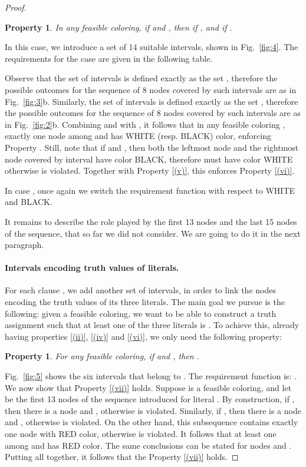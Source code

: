 \documentclass[a4paper,11pt]{article}
\theoremstyle{theorem}
\newtheorem{property}[theorem]{Property}
\begin{document}
\begin{proof}
\begin{property}\label{(vi)}
In any feasible coloring, if  and , then  if , and  if . 
\end{property}

\noindent In this case, we introduce a set  of 14 suitable intervals, shown in Fig.~\ref{fig:4}. 
The requirements for the case  are given in the following table.


\noindent Observe that the set of intervals  is defined exactly as the set , therefore the possible outcomes for the sequence of 8 nodes covered by such intervals are as in Fig.~\ref{fig:3}b.  
Similarly, the set of intervals  is defined exactly as the set , therefore the possible outcomes for the sequence of 8 nodes covered by such intervals are as in Fig.~\ref{fig:2}b.  
Combining  and  with , it follows that in any feasible coloring , exactly one node among  and  has WHITE (resp. BLACK) color, 
enforcing Property .
Still, note that if  and , then both the leftmost node and the rightmost node covered by interval  have color BLACK, therefore  must have color WHITE otherwise  is violated. Together with Property  \eqref{(v)}, this enforces Property \eqref{(vi)}.  

In case , once again we switch the requirement function with respect to WHITE and BLACK. 

\smallskip
\noindent It remains to describe the role played by the first 13 nodes and the last 15 nodes of the sequence, that so far we did not consider. We are going to do it in the next paragraph.

\paragraph{Intervals encoding truth values of literals.} For each clause , we add another set  of intervals, in order to link the nodes encoding the truth values of its three literals. The main goal we pursue is the following: given a feasible coloring, we want to be able to construct a truth assignment such that at least one of the three literals is . To achieve this, already having properties \eqref{(ii)}, \eqref{(iv)} and \eqref{(vi)}, we only need the following property:

\begin{property}\label{(vii)}
For any feasible coloring, if  and  , then .
\end{property}

\noindent Fig.~\ref{fig:5} shows the six intervals that belong to . The requirement function is:      . We now show that Property \eqref{(vii)} holds.
Suppose  is a feasible coloring, and let  be the first 13 nodes of the sequence introduced for literal . By construction, if , then there is a node  and  , otherwise  is violated. Similarly, if , then there is a node  and  , otherwise  is violated. On the other hand, this subsequence contains exactly one node with RED color, otherwise  is violated. It follows that at least one among  and  has RED color. The same conclusions can be stated for nodes  and . Putting all together, it follows that the Property \eqref{(vii)} holds. 


\end{proof}
\end{document}
